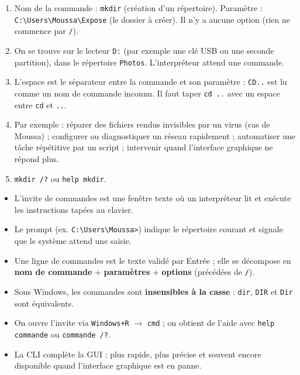\documentclass[11pt]{article}
\newcommand{\cle}[1]{{\popxbold\color{popdark}#1}}
\begin{document}
\begin{corrige}
\begin{enumerate}
\item Nom de la commande : \texttt{mkdir} (création d'un répertoire). Paramètre : \texttt{C:\textbackslash Users\textbackslash Moussa\textbackslash Expose} (le dossier à créer). Il n'y a aucune option (rien ne commence par \texttt{/}).
\item On se trouve sur le lecteur \texttt{D:} (par exemple une clé USB ou une seconde partition), dans le répertoire \texttt{Photos}. L'interpréteur attend une commande.
\item L'espace est le séparateur entre la commande et son paramètre : \texttt{CD..} est lu comme un nom de commande inconnu. Il faut taper \texttt{cd ..} avec un espace entre \texttt{cd} et \texttt{..}.
\item Par exemple : réparer des fichiers rendus invisibles par un virus (cas de Moussa) ; configurer ou diagnostiquer un réseau rapidement ; automatiser une tâche répétitive par un script ; intervenir quand l'interface graphique ne répond plus.
\item \texttt{mkdir /?} ou \texttt{help mkdir}.
\end{enumerate}
\end{corrige}

\begin{aretenir}
\begin{itemize}
\item L'\cle{invite de commandes} est une fenêtre texte où un interpréteur lit et exécute les instructions tapées au clavier.
\item Le \cle{prompt} (ex. \texttt{C:\textbackslash Users\textbackslash Moussa>}) indique le répertoire courant et signale que le système attend une saisie.
\item Une \cle{ligne de commandes} est le texte validé par Entrée ; elle se décompose en \textbf{nom de commande} + \textbf{paramètres} + \textbf{options} (précédées de \texttt{/}).
\item Sous Windows, les commandes sont \textbf{insensibles à la casse} : \texttt{dir}, \texttt{DIR} et \texttt{Dir} sont équivalents.
\item On ouvre l'invite via \texttt{Windows+R} $\rightarrow$ \texttt{cmd} ; on obtient de l'aide avec \texttt{help commande} ou \texttt{commande /?}.
\item La CLI complète la GUI : plus rapide, plus précise et souvent encore disponible quand l'interface graphique est en panne.
\end{itemize}
\end{aretenir}
\end{document}
